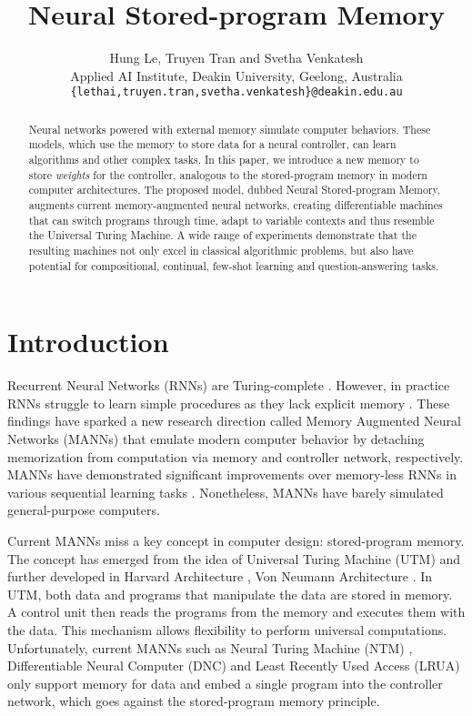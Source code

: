\documentclass[english]{article}
\renewcommand{\cite}{\citep}
\begin{document}
\title{Neural Stored-program Memory}
\author{Hung Le, Truyen Tran and Svetha Venkatesh\\
Applied AI Institute, Deakin University, Geelong, Australia\\
\texttt{\{lethai,truyen.tran,svetha.venkatesh\}@deakin.edu.au}}
\maketitle
\begin{abstract}
Neural networks powered with external memory simulate computer behaviors.
These models, which use the memory to store data for a neural controller,
can learn algorithms and other complex tasks. In this paper, we introduce
a new memory to store \emph{weights} for the controller, analogous
to the stored-program memory in modern computer architectures. The
proposed model, dubbed Neural Stored-program Memory, augments current
memory-augmented neural networks, creating differentiable machines
that can switch programs through time, adapt to variable contexts
and thus resemble the Universal Turing Machine. A wide range of experiments
demonstrate that the resulting machines not only excel in classical
algorithmic problems, but also have potential for compositional, continual,
few-shot learning and question-answering tasks. 
 \end{abstract}

\section{Introduction}

Recurrent Neural Networks (RNNs) are Turing-complete \cite{siegelmann1995computational}.
However, in practice RNNs struggle to learn simple procedures as they
lack explicit memory \cite{graves2014neural,mozer1993connectionist}.
These findings have sparked a new research direction called Memory
Augmented Neural Networks (MANNs) that emulate modern computer behavior
by detaching memorization from computation via memory and controller
network, respectively. MANNs have demonstrated significant improvements
over memory-less RNNs in various sequential learning tasks \cite{graves2016hybrid,le2018variational,NIPS2015_5846}.
Nonetheless, MANNs have barely simulated general-purpose computers.

Current MANNs miss a key concept in computer design: stored-program
memory. The concept has emerged from the idea of Universal Turing
Machine (UTM) \cite{turing1936} and further developed in Harvard
Architecture \cite{BROESCH2009135}, Von Neumann Architecture \cite{vonNeumann:1993:FDR:612487.612553}.
In UTM, both data and programs that manipulate the data are stored
in memory. A control unit then reads the programs from the memory
and executes them with the data. This mechanism allows flexibility
to perform universal computations. Unfortunately, current MANNs such
as Neural Turing Machine (NTM) \cite{graves2014neural}, Differentiable
Neural Computer (DNC) \cite{graves2016hybrid} and Least Recently
Used Access (LRUA) \cite{santoro2016meta} only support memory for
data and embed a single program into the controller network, which
goes against the stored-program memory principle. 
\end{document}
